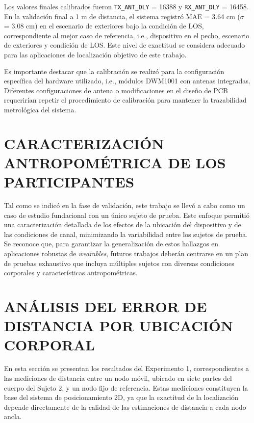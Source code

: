 Los valores finales calibrados fueron \texttt{TX\_ANT\_DLY} = 16388 y \texttt{RX\_ANT\_DLY} = 16458. En la validación final a 1 m de distancia, el sistema registró MAE = 3.64 cm ($\sigma$ = 3.08 cm) en el escenario de exteriores bajo la condición de LOS, correspondiente al mejor caso de referencia, i.e., dispositivo en el pecho, escenario de exteriores y condición de LOS. Este nivel de exactitud se considera adecuado para las aplicaciones de localización objetivo de este trabajo.

Es importante destacar que la calibración se realizó para la configuración específica del hardware utilizado, i.e., módulos DWM1001 con antenas integradas. Diferentes configuraciones de antena o modificaciones en el diseño de PCB requerirían repetir el procedimiento de calibración para mantener la trazabilidad metrológica del sistema.


\section{CARACTERIZACIÓN ANTROPOMÉTRICA DE LOS PARTICIPANTES}
\label{sec:caracteristicas_participantes}

Tal como se indicó en la fase de validación, este trabajo se llevó a cabo como un caso de estudio fundacional con un único sujeto de prueba. Este enfoque permitió una caracterización detallada de los efectos de la ubicación del dispositivo y de las condiciones de canal, minimizando la variabilidad entre los sujetos de prueba. Se reconoce que, para garantizar la generalización de estos hallazgos en aplicaciones robustas de \textit{wearables}, futuros trabajos deberán centrarse en un plan de pruebas exhaustivo que incluya múltiples sujetos con diversas condiciones corporales y características antropométricas.

\section{ANÁLISIS DEL ERROR DE DISTANCIA POR UBICACIÓN CORPORAL}
\label{sec:error_por_ubicacion}

En esta sección se presentan los resultados del Experimento 1, correspondientes a las mediciones de distancia entre un nodo móvil, ubicado en siete partes del cuerpo del Sujeto 2, y un nodo fijo de referencia. Estas mediciones constituyen la base del sistema de posicionamiento 2D, ya que la exactitud de la localización depende directamente de la calidad de las estimaciones de distancia a cada nodo ancla.

